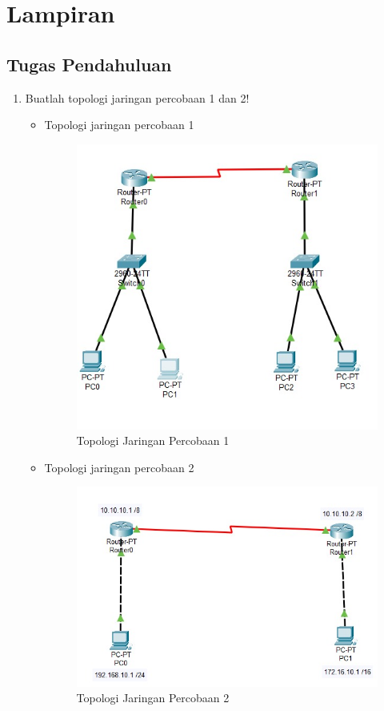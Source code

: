 \section{Lampiran}

\subsection{Tugas Pendahuluan}
\begin{enumerate}
	\item Buatlah topologi jaringan percobaan 1 dan 2!
	\begin{itemize}
		\item Topologi jaringan percobaan 1
		\begin{figure}[H]
		\centering
		\includegraphics[width=0.75\linewidth]{P2/img/topologi1.jpg}
		\caption{Topologi Jaringan Percobaan 1}
		\label{fig:gambar31}
		\end{figure}
	
		\item Topologi jaringan percobaan 2
		\begin{figure}[H]
			\centering
			\includegraphics[width=0.75\linewidth]{P2/img/topologi2.jpg}
			\caption{Topologi Jaringan Percobaan 2}
			\label{fig:gambar32}
		\end{figure}
	\end{itemize}
	


\end{enumerate}
